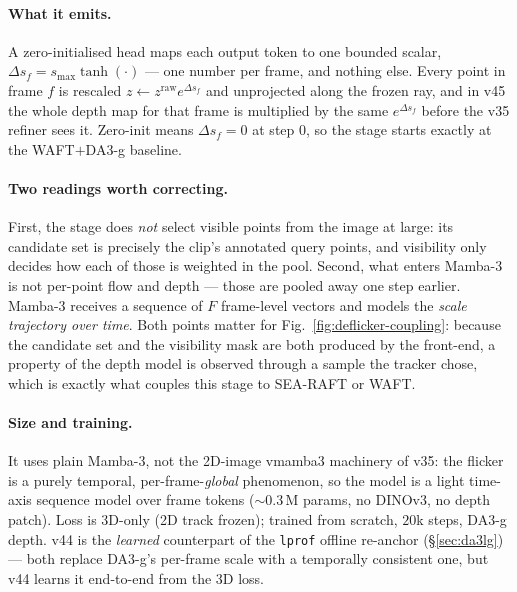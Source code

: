 \documentclass[11pt,a4paper]{article}
\begin{document}
\paragraph{What it emits.} A zero-initialised head maps each output token to one bounded scalar,
$\Delta s_f=s_{\max}\tanh(\cdot)$ --- one number per frame, and nothing else. Every point in frame
$f$ is rescaled $z\leftarrow z^{\text{raw}}e^{\Delta s_f}$ and unprojected along the frozen ray, and
in v45 the whole depth map for that frame is multiplied by the same $e^{\Delta s_f}$ before the v35
refiner sees it. Zero-init means $\Delta s_f=0$ at step $0$, so the stage starts exactly at the
WAFT$+$DA3-g baseline.

\paragraph{Two readings worth correcting.} First, the stage does \emph{not} select visible points
from the image at large: its candidate set is precisely the clip's annotated query points, and
visibility only decides how each of those is weighted in the pool. Second, what enters Mamba-3 is
not per-point flow and depth --- those are pooled away one step earlier. Mamba-3 receives a
sequence of $F$ frame-level vectors and models the \emph{scale trajectory over time}. Both points
matter for Fig.~\ref{fig:deflicker-coupling}: because the candidate set and the visibility mask are
both produced by the front-end, a property of the depth model is observed through a sample the
tracker chose, which is exactly what couples this stage to SEA-RAFT or WAFT.

\paragraph{Size and training.} It uses plain Mamba-3, not the
2D-image vmamba3 machinery of v35: the flicker is a purely temporal, per-frame-\emph{global} phenomenon, so
the model is a light time-axis sequence model over frame tokens ($\sim$0.3\,M params, no DINOv3, no depth
patch). Loss is 3D-only (2D track frozen); trained from scratch, $20$k steps, DA3-g depth. v44 is the
\emph{learned} counterpart of the \texttt{lprof} offline re-anchor (\S\ref{sec:da3lg}) --- both replace
DA3-g's per-frame scale with a temporally consistent one, but v44 learns it end-to-end from the 3D loss.
\end{document}
